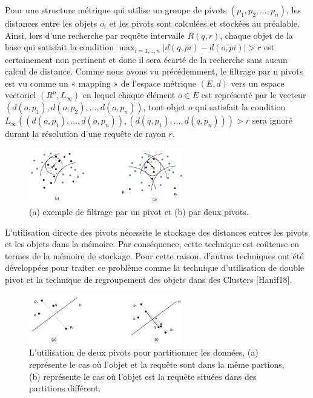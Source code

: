 Pour une structure métrique qui utilise un groupe de pivots $ (p_1,p_2,…, p_n) $, les distances entre les objets $ o_i $ et les pivots sont calculées et stockées au préalable. Ainsi, lors d’une recherche par requête intervalle $ R(q,r) $, chaque objet de la base qui satisfait la condition $ \max_{i=1,..,n}{|d(q,pi)-d(o,pi)|} > r $ est certainement non pertinent et donc il sera écarté de la recherche sans aucun calcul de distance. Comme nous avons vu précédemment, le filtrage par n pivots est vu comme un « mapping » de l’espace métrique $ (E,d) $ vers un espace vectoriel $ (R^n, L_\infty) $ en lequel chaque élément $ o \in E $ est représenté par le vecteur $ (d(o,p_1), d(o,p_2),..., d(o,p_n)) $, tout objet $ o $ qui satisfait la condition $ L_\infty((d(o,p_1),..., d(o,p_n)),(d(q,p_1),..., d(q,p_n))) > r  $ sera ignoré durant la résolution d’une requête de rayon $ r $.

\begin{figure}[H]
	\centering
	\includegraphics[width=0.6\textwidth]{Figures/npivot.png} %
	\caption{(a) exemple de filtrage par un pivot et (b) par deux pivots.}
\end{figure}

L’utilisation directe des pivots nécessite le stockage des distances entres les pivots et les objets dans la mémoire. Par conséquence, cette technique est coûteuse en termes de la mémoire de stockage. Pour cette raison, d'autres techniques ont été développées pour traiter ce problème comme la technique d’utilisation de double pivot et la technique de regroupement des objets dans des Clusters [Hanif18].


\begin{figure}[H]
	\centering
	\includegraphics[width=0.6\textwidth]{Figures/2pivot.png} %
	\caption{L'utilisation de deux pivots pour partitionner les données, (a) représente le cas où l'objet et la requête sont dans la même partions, (b) représente le cas où l’objet est la requête situées dans des partitions différent.}
\end{figure}

